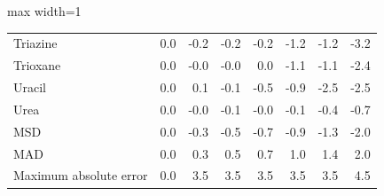 \begin{table}[h]
\begin{adjustbox}{max width=1\textwidth}
\begin{tabular}{lrrrrrrr}
Triazine & 0.0 & -0.2 & -0.2 & -0.2 & -1.2 & -1.2 & -3.2 \\
Trioxane & 0.0 & -0.0 & -0.0 & 0.0 & -1.1 & -1.1 & -2.4 \\
Uracil & 0.0 & 0.1 & -0.1 & -0.5 & -0.9 & -2.5 & -2.5 \\
Urea & 0.0 & -0.0 & -0.1 & -0.0 & -0.1 & -0.4 & -0.7 \\
MSD & 0.0 & -0.3 & -0.5 & -0.7 & -0.9 & -1.3 & -2.0 \\
MAD & 0.0 & 0.3 & 0.5 & 0.7 & 1.0 & 1.4 & 2.0 \\
Maximum absolute error & 0.0 & 3.5 & 3.5 & 3.5 & 3.5 & 3.5 & 4.5 \\
\bottomrule
\end{tabular}
\end{adjustbox}

\end{table}